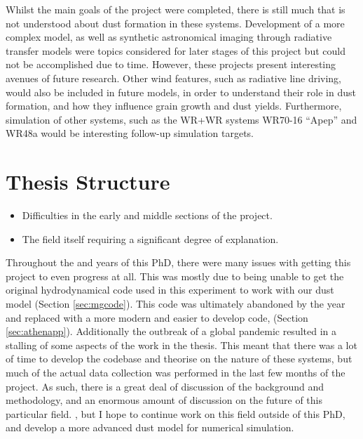 Whilst the main goals of the project were completed, there is still much that is not understood about dust formation in these systems.
Development of a more complex model, as well as synthetic astronomical imaging through radiative transfer models were topics considered for later stages of this project but could not be accomplished due to time.
However, these projects present interesting avenues of future research.
Other wind features, such as radiative line driving, would also be included in future models, in order to understand their role in dust formation, and how they influence grain growth and dust yields.
Furthermore, simulation of other systems, such as the WR+WR systems WR70-16 ``Apep'' and WR48a would be interesting follow-up simulation targets.

\section{Thesis Structure}


\begin{itemize}
  \item Difficulties in the early and middle sections of the project.
  \item The field itself requiring a significant degree of explanation.
\end{itemize}

\noindent
Throughout the  and  years of this PhD, there were many issues with getting this project to even progress at all.
This was mostly due to being unable to get the original hydrodynamical code used in this experiment to work with our dust model (Section \ref{sec:mgcode}).
This code was ultimately abandoned by the  year and replaced with a more modern and easier to develop code, \athena{} (Section \ref{sec:athenapp}).
Additionally the outbreak of a global pandemic resulted in a stalling of some aspects of the work in the thesis.
This meant that there was a lot of time to develop the codebase and theorise on the nature of these systems, but much of the actual data collection was performed in the last few months of the project.
As such, there is a great deal of discussion of the background and methodology, and an enormous amount of discussion on the future of this particular field.
, but I hope to continue work on this field outside of this PhD, and develop a more advanced dust model for numerical simulation.

